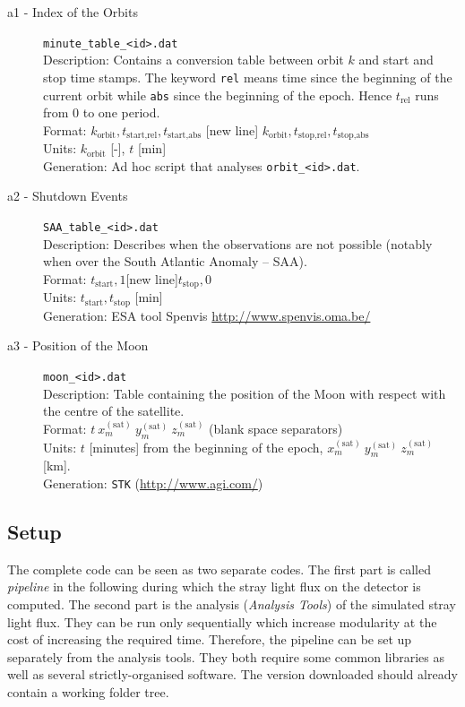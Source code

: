 \documentclass[a4paper,10pt]{article}
\newcommand{\httplink}[1]{{\href{#1}{#1}}}
\begin{document}
\begin{description}
\item [a1 - Index of the Orbits] \verb=minute_table_<id>.dat=
 	\\ Description: Contains a conversion table between orbit $k$ and start and stop time stamps. The keyword \verb=rel= means time since the beginning of the current orbit while \verb=abs= since the beginning of the epoch. Hence $t_\text{rel}$ runs from 0 to one period.
	\\ Format: $k_\text{orbit},t_\text{start,rel},t_\text{start,abs}$ [new line] $k_\text{orbit},t_\text{stop,rel},t_\text{stop,abs}$
	\\ Units: $k_\text{orbit}$ [-], $t$ [min]
	\\ Generation: Ad hoc script that analyses \verb=orbit_<id>.dat=.
\item [a2 - Shutdown Events] \verb=SAA_table_<id>.dat=
 	\\ Description: Describes when the observations are not possible (notably when over the South Atlantic Anomaly -- SAA).
	\\ Format: $t_\text{start},1$[new line]$t_\text{stop},0$
	\\ Units: $t_\text{start}, t_\text{stop}$ [min]
	\\ Generation: ESA tool Spenvis \httplink{http://www.spenvis.oma.be/}
\item [a3 - Position of the Moon] \verb=moon_<id>.dat=
 	\\ Description: Table containing the position of the Moon with respect with the centre of the satellite.
	\\ Format: $t\ x_m^{(\text{sat})}\ y_m^{(\text{sat})}\ z_m^{(\text{sat})}$ (blank space separators)
	\\ Units: $t$ [minutes] from the beginning of the epoch, $x_m^{(\text{sat})}\ y_m^{(\text{sat})}\ z_m^{(\text{sat})}$ [km].
	\\ Generation: \verb=STK= (\httplink{http://www.agi.com/})
\end{description}

\subsection{Setup} \label{sec:setup}
The complete code can be seen as two separate codes. The first part is called \emph{pipeline} in the following during which the stray light flux on the detector is computed. The second part is the analysis (\emph{Analysis Tools}) of the simulated stray light flux. They can be run only sequentially which increase modularity at the cost of increasing the required time. Therefore, the pipeline can be set up separately from the analysis tools. They both require some common libraries as well as several strictly-organised software. The version downloaded should already contain a working folder tree.
\end{document}
